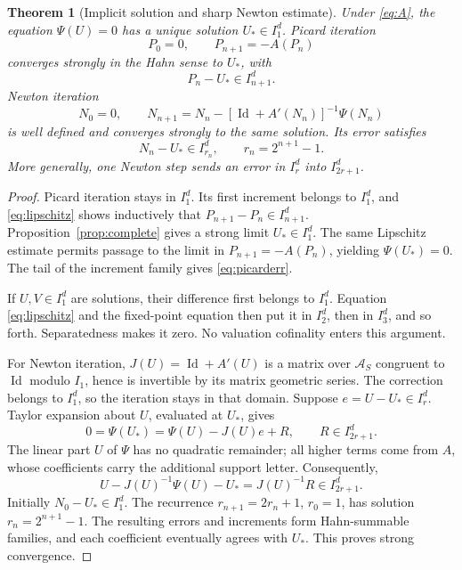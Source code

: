 \documentclass[11pt,a4paper]{article}
\newtheorem{theorem}{Theorem}[section]
\theoremstyle{definition}
\theoremstyle{remark}
\newcommand{\AS}{\mathscr A_S}
\newcommand{\Id}{\operatorname{Id}}
\begin{document}
\begin{theorem}[Implicit solution and sharp Newton estimate]
\label{thm:implicit}
Under \eqref{eq:A}, the equation $\Psi(U)=0$ has a unique solution
$U_*\in I_1^d$. Picard iteration
\[
 P_0=0,\qquad P_{n+1}=-A(P_n)
\]
converges strongly in the Hahn sense to $U_*$, with
\begin{equation}\label{eq:picarderr}
 P_n-U_*\in I_{n+1}^d.
\end{equation}
Newton iteration
\begin{equation}\label{eq:newton}
 N_0=0,\qquad
 N_{n+1}=N_n-[\Id+A'(N_n)]^{-1}\Psi(N_n)
\end{equation}
is well defined and converges strongly to the same solution. Its error
satisfies
\begin{equation}\label{eq:newtondepth}
 N_n-U_*\in I_{r_n}^d,\qquad r_n=2^{n+1}-1.
\end{equation}
More generally, one Newton step sends an error in $I_r^d$ into
$I_{2r+1}^d$.
\end{theorem}
\begin{proof}
Picard iteration stays in $I_1^d$. Its first increment belongs to $I_1^d$,
and \eqref{eq:lipschitz} shows inductively that
$P_{n+1}-P_n\in I_{n+1}^d$. Proposition~\ref{prop:complete} gives a strong
limit $U_*\in I_1^d$. The same Lipschitz estimate permits passage to the
limit in $P_{n+1}=-A(P_n)$, yielding $\Psi(U_*)=0$.
The tail of the increment family gives \eqref{eq:picarderr}.

If $U,V\in I_1^d$ are solutions, their difference first belongs to $I_1^d$.
Equation \eqref{eq:lipschitz} and the fixed-point equation then put it in
$I_2^d$, then in $I_3^d$, and so forth. Separatedness makes it zero.
No valuation cofinality enters this argument.

For Newton iteration, $J(U)=\Id+A'(U)$ is a matrix over $\AS$ congruent to
$\Id$ modulo $I_1$, hence is invertible by its matrix geometric series.
The correction belongs to $I_1^d$, so the iteration stays in that domain.
Suppose $e=U-U_*\in I_r^d$. Taylor expansion about $U$, evaluated at $U_*$,
gives
\[
 0=\Psi(U_*)=\Psi(U)-J(U)e+R,
 \qquad R\in I_{2r+1}^d.
\]
The linear part $U$ of $\Psi$ has no quadratic remainder; all higher
terms come from $A$, whose coefficients carry the additional support
letter. Consequently,
\[
 U-J(U)^{-1}\Psi(U)-U_*=J(U)^{-1}R\in I_{2r+1}^d.
\]
Initially $N_0-U_*\in I_1^d$. The recurrence
$r_{n+1}=2r_n+1$, $r_0=1$, has solution $r_n=2^{n+1}-1$.
The resulting errors and increments form Hahn-summable families, and each
coefficient eventually agrees with $U_*$. This proves strong convergence.
\end{proof}
\end{document}
